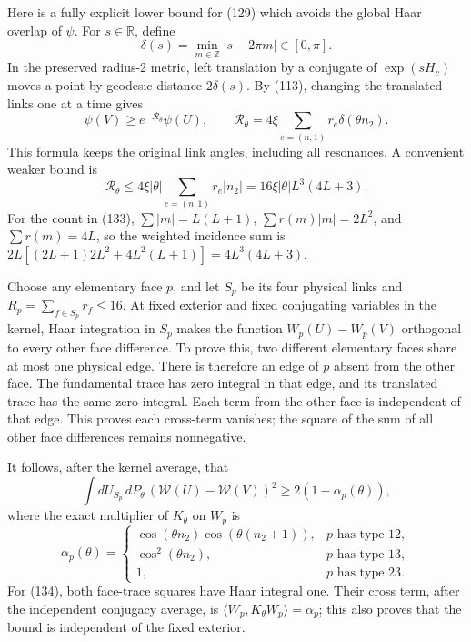 \documentclass[
  11pt,
]{article}
\begin{document}
Here is a fully explicit lower bound for (129) which avoids the global
Haar overlap of \(\psi\). For \(s\in\mathbb R\), define \[
 \delta(s)=\min_{m\in\mathbb Z}|s-2\pi m|\in[0,\pi].
\] In the preserved radius-2 metric, left translation by a conjugate of
\(\exp(sH_c)\) moves a point by geodesic distance \(2\delta(s)\). By
(113), changing the translated links one at a time gives \[
 \psi(V)\ge e^{-\mathscr R_\theta}\psi(U),\qquad
 \mathscr R_\theta=4\xi\sum_{e=(n,1)}r_e\delta(\theta n_2).
 \tag{132}
\] This formula keeps the original link angles, including all
resonances. A convenient weaker bound is \[
 \mathscr R_\theta
 \le4\xi|\theta|\sum_{e=(n,1)}r_e|n_2|
 =16\xi|\theta|L^3(4L+3).
 \tag{133}
\] For the count in (133), \(\sum|m|=L(L+1)\), \(\sum r(m)|m|=2L^2\),
and \(\sum r(m)=4L\), so the weighted incidence sum is
\(2L[(2L+1)2L^2+4L^2(L+1)]
 =4L^3(4L+3)\).

Choose any elementary face \(p\), and let \(S_p\) be its four physical
links and \(R_p=\sum_{f\in S_p}r_f\le16\). At fixed exterior and fixed
conjugating variables in the kernel, Haar integration in \(S_p\) makes
the function \(W_p(U)-W_p(V)\) orthogonal to every other face
difference. To prove this, two different elementary faces share at most
one physical edge. There is therefore an edge of \(p\) absent from the
other face. The fundamental trace has zero integral in that edge, and
its translated trace has the same zero integral. Each term from the
other face is independent of that edge. This proves each cross-term
vanishes; the square of the sum of all other face differences remains
nonnegative.

It follows, after the kernel average, that \[
 \int dU_{S_p}\,dP_\theta\,
    (\mathcal W(U)-\mathcal W(V))^2
 \ge 2(1-\alpha_p(\theta)),
 \tag{134}
\] where the exact multiplier of \(K_\theta\) on \(W_p\) is \[
 \alpha_p(\theta)=
 \begin{cases}
 \cos(\theta n_2)\cos(\theta(n_2+1)),&p\text{ has type }12,\\
 \cos^2(\theta n_2),&p\text{ has type }13,\\
 1,&p\text{ has type }23.
 \end{cases}
\] For (134), both face-trace squares have Haar integral one. Their
cross term, after the independent conjugacy average, is
\(\langle W_p,K_\theta W_p\rangle=\alpha_p\); this also proves that the
bound is independent of the fixed exterior.
\end{document}
